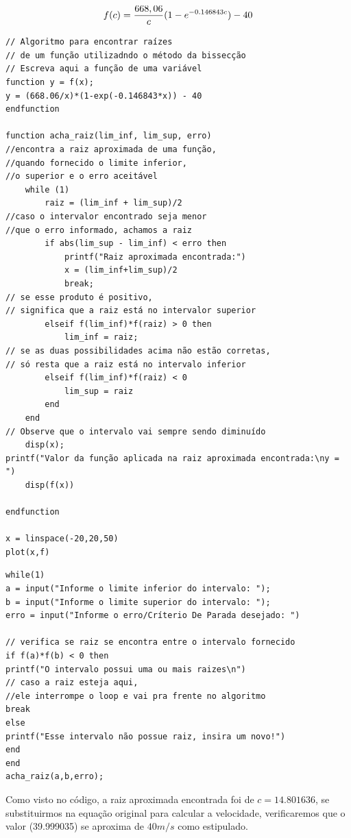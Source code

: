 $$\Large f(c) = \frac{668,06}{c}(1 - e^{-0.146843c})-40$$

\begin{verbatim}
// Algoritmo para encontrar raízes 
// de um função utilizadndo o método da bissecção 
// Escreva aqui a função de uma variável 
function y = f(x); 
y = (668.06/x)*(1-exp(-0.146843*x)) - 40 
endfunction

function acha_raiz(lim_inf, lim_sup, erro) 
//encontra a raiz aproximada de uma função, 
//quando fornecido o limite inferior, 
//o superior e o erro aceitável    
	while (1)
		raiz = (lim_inf + lim_sup)/2
//caso o intervalor encontrado seja menor 
//que o erro informado, achamos a raiz
		if abs(lim_sup - lim_inf) < erro then
			printf("Raiz aproximada encontrada:")
			x = (lim_inf+lim_sup)/2
			break;
// se esse produto é positivo, 
// significa que a raiz está no intervalor superior
		elseif f(lim_inf)*f(raiz) > 0 then 
			lim_inf = raiz;
// se as duas possibilidades acima não estão corretas, 
// só resta que a raiz está no intervalo inferior
		elseif f(lim_inf)*f(raiz) < 0  
			lim_sup = raiz                
		end
	end
// Observe que o intervalo vai sempre sendo diminuído
	disp(x);
printf("Valor da função aplicada na raiz aproximada encontrada:\ny = ")
	disp(f(x))

endfunction

x = linspace(-20,20,50)
plot(x,f)
\end{verbatim}

\begin{verbatim}
while(1)
a = input("Informe o limite inferior do intervalo: ");
b = input("Informe o limite superior do intervalo: ");
erro = input("Informe o erro/Críterio De Parada desejado: ")

// verifica se raiz se encontra entre o intervalo fornecido
if f(a)*f(b) < 0 then 
printf("O intervalo possui uma ou mais raizes\n")
// caso a raiz esteja aqui, 
//ele interrompe o loop e vai pra frente no algoritmo
break 
else
printf("Esse intervalo não possue raiz, insira um novo!")
end
end
acha_raiz(a,b,erro);
\end{verbatim}

Como visto no código, a raiz aproximada encontrada foi de $c = 14.801636$, se substituirmos na equação original para calcular a velocidade, verificaremos que o valor (39.999035) se aproxima de $40 m/s$ como estipulado.